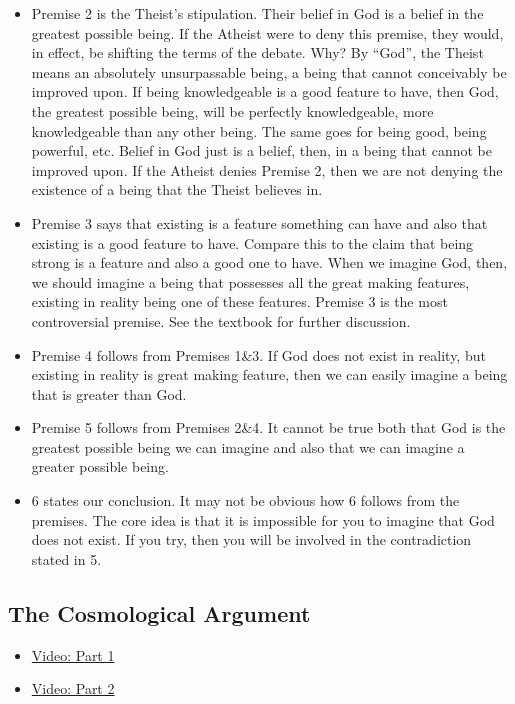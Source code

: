 \documentclass[]{article}
\begin{document}
\begin{itemize}
\item
  Premise 2 is the Theist's stipulation. Their belief in God is a belief
  in the greatest possible being. If the Atheist were to deny this
  premise, they would, in effect, be shifting the terms of the debate.
  Why? By ``God'', the Theist means an absolutely unsurpassable being, a
  being that cannot conceivably be improved upon. If being knowledgeable
  is a good feature to have, then God, the greatest possible being, will
  be perfectly knowledgeable, more knowledgeable than any other being.
  The same goes for being good, being powerful, etc. Belief in God just
  is a belief, then, in a being that cannot be improved upon. If the
  Atheist denies Premise 2, then we are not denying the existence of a
  being that the Theist believes in.
\item
  Premise 3 says that existing is a feature something can have and also
  that existing is a good feature to have. Compare this to the claim
  that being strong is a feature and also a good one to have. When we
  imagine God, then, we should imagine a being that possesses all the
  great making features, existing in reality being one of these
  features. Premise 3 is the most controversial premise. See the
  textbook for further discussion.
\item
  Premise 4 follows from Premises 1\&3. If God does not exist in
  reality, but existing in reality is great making feature, then we can
  easily imagine a being that is greater than God.
\item
  Premise 5 follows from Premises 2\&4. It cannot be true both that God
  is the greatest possible being we can imagine and also that we can
  imagine a greater possible being.
\item
  6 states our conclusion. It may not be obvious how 6 follows from the
  premises. The core idea is that it is impossible for you to imagine
  that God does not exist. If you try, then you will be involved in the
  contradiction stated in 5.
\end{itemize}

\subsection{The Cosmological Argument}\label{the-cosmological-argument}

\begin{itemize}
\itemsep1pt\parskip0pt
\item
  \href{https://www.youtube.com/watch?v=2zS1HiuWPMA}{Video: Part 1}
\item
  \href{https://www.youtube.com/watch?v=mBMAMIFw9n4}{Video: Part 2}
\end{itemize}
\end{document}
